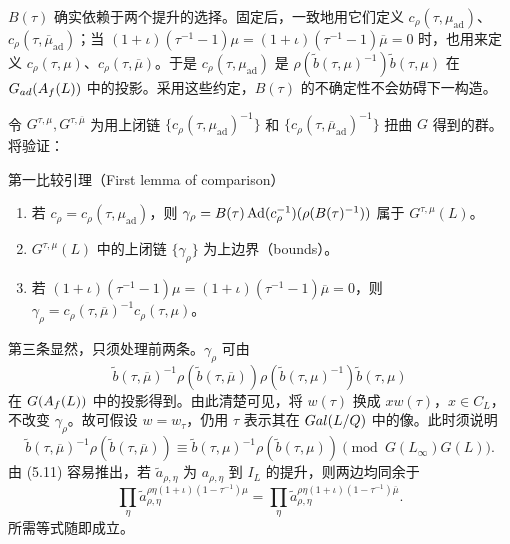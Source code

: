$B(\tau)$ 确实依赖于两个提升的选择。固定后，一致地用它们定义
$c_\rho(\tau,\mu_{\mathrm{ad}})$、$c_\rho(\tau,\overline\mu_{\mathrm{ad}})$；当
$(1+\iota)(\tau^{-1}-1)\mu=(1+\iota)(\tau^{-1}-1)\overline\mu=0$ 时，也用来定义
$c_\rho(\tau,\mu)$、$c_\rho(\tau,\overline\mu)$。于是
$c_\rho(\tau,\mu_{\mathrm{ad}})$ 是
$\rho(\widetilde b(\tau,\mu)^{-1})\widetilde b(\tau,\mu)$ 在
$G_{ad}(A_f(L))$ 中的投影。采用这些约定，$B(\tau)$ 的不确定性不会妨碍下一构造。

令 $G^{\tau,\mu},G^{\tau,\overline\mu}$ 为用上闭链
$\{c_\rho(\tau,\mu_{\mathrm{ad}})^{-1}\}$ 和
$\{c_\rho(\tau,\overline\mu_{\mathrm{ad}})^{-1}\}$ 扭曲 $G$ 得到的群。将验证：
\begin{originaltheorem}{第一比较引理（First lemma of comparison）}
\begin{enumerate}
\item[(i)] 若 $c_\rho=c_\rho(\tau,\mu_{\mathrm{ad}})$，则
$\gamma_\rho=B(\tau)\operatorname{Ad}(c_\rho^{-1})(\rho(B(\tau)^{-1}))$ 属于 $G^{\tau,\mu}(L)$。
\item[(ii)] $G^{\tau,\mu}(L)$ 中的上闭链 $\{\gamma_\rho\}$ 为上边界（bounds）。
\item[(iii)] 若 $(1+\iota)(\tau^{-1}-1)\mu=(1+\iota)(\tau^{-1}-1)\overline\mu=0$，则
$\gamma_\rho=c_\rho(\tau,\overline\mu)^{-1}c_\rho(\tau,\mu)$。
\end{enumerate}
\end{originaltheorem}
第三条显然，只须处理前两条。$\gamma_\rho$ 可由
\begin{equation}
\widetilde b(\tau,\overline\mu)^{-1}\rho(\widetilde b(\tau,\overline\mu))
\rho(\widetilde b(\tau,\mu)^{-1})\widetilde b(\tau,\mu)\tag{6.1}
\end{equation}
在 $G(A_f(L))$ 中的投影得到。由此清楚可见，将 $w(\tau)$ 换成
$xw(\tau)$，$x\in C_L$，不改变 $\gamma_\rho$。故可假设 $w=w_\tau$，仍用
$\tau$ 表示其在 $Gal(L/Q)$ 中的像。此时须说明
\[
\widetilde b(\tau,\overline\mu)^{-1}\rho(\widetilde b(\tau,\overline\mu))
\equiv\widetilde b(\tau,\mu)^{-1}\rho(\widetilde b(\tau,\mu))
\pmod{G(L_\infty)G(L)}.
\]
由 (5.11) 容易推出，若 $\widetilde a_{\rho,\eta}$ 为
$a_{\rho,\eta}$ 到 $I_L$ 的提升，则两边均同余于
\[
\prod_\eta\widetilde a_{\rho,\eta}^{\rho\eta(1+\iota)(1-\tau^{-1})\mu}
=\prod_\eta\widetilde a_{\rho,\eta}^{\rho\eta(1+\iota)(1-\tau^{-1})\overline\mu}.
\]
所需等式随即成立。

